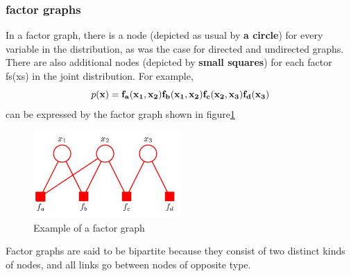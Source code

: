 \documentclass[a4paper]{book}
\begin{document}
\subsubsection{factor graphs}
In a factor graph, there is a node (depicted as usual by \textbf{a circle}) for every variable
in the distribution, as was the case for directed and undirected graphs. There are also
additional nodes (depicted by \textbf{small squares}) for each factor fs(xs) in the joint distribution.\newline
For example,
\begin{equation}\label{eq8.21}
  p(\bf{x}) = f_a(x_1,x_2)f_b(x_1,x_2)f_c(x_2,x_3)f_d(x_3)
\end{equation}
can be expressed by the factor graph shown in figure\ref{GM5}
\begin{figure}
  \centering
  \includegraphics[width=0.5\textwidth]{./imgs/GM5.jpg}
  \caption{Example of a factor graph}\label{GM5}
\end{figure}
Factor graphs are said to be bipartite because they consist of two distinct kinds
of nodes, and all links go between nodes of opposite type.
\end{document}
